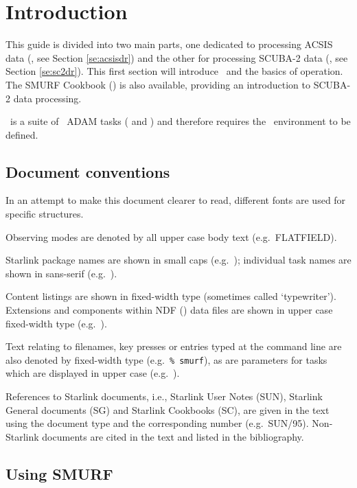 \documentclass[oneside,11pt]{starlink}
\begin{document}
\scfrontmatter

\section{Introduction\label{se:smurfintro}}


This guide is divided into two main parts, one dedicated to processing
ACSIS data (\cite{acsis}, see Section \ref{se:acsisdr}) and the other
for processing SCUBA-2 data (\cite{scuba2}, see Section
\ref{se:sc2dr}). This first section will introduce \SMURF\ and the
basics of operation. The SMURF Cookbook (\SMURFcook) is also
available, providing an introduction to SCUBA-2 data processing.

\SMURF\ is a suite of \starlink\ ADAM tasks (
and ) and therefore requires the \starlink\
environment to be defined.

\subsection{Document conventions}

In an attempt to make this document clearer to read, different fonts
are used for specific structures.

Observing modes are denoted by all upper case body text (e.g.\
FLATFIELD).

Starlink package names are shown in small caps (e.g.\ \SMURF);
individual task names are shown in sans-serif (e.g.\ \makemap).

Content listings are shown in fixed-width type (sometimes called
`typewriter'). Extensions and components within NDF (\ndfref) data
files are shown in upper case fixed-width type (e.g.\
).

Text relating to filenames, key presses or entries typed at the
command line are also denoted by fixed-width type (e.g.\ \texttt{\%
  smurf}), as are parameters for tasks which are displayed in upper
case (e.g.\ \aparam{METHOD}).

References to Starlink documents, i.e., Starlink User Notes (SUN),
Starlink General documents (SG) and Starlink Cookbooks (SC), are given
in the text using the document type and the corresponding number
(e.g.\ SUN/95). Non-Starlink documents are cited in the text and
listed in the bibliography.

\subsection{Using SMURF}
\end{document}
